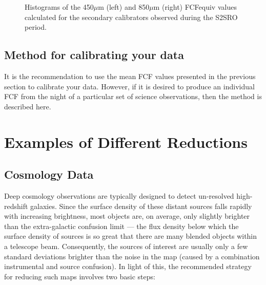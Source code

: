 \documentclass[twoside,11pt]{article}
\newcommand{\xref}[3]{#1}
\newcommand{\xlabel}[1]{}
\renewcommand{\_}{\texttt{\symbol{95}}}
\newcommand{\task}[1]{\textsf{#1}}
\newcommand{\cmult}{\xref{\task{cmult}}{sun95}{CMULT}}
\begin{document}
\begin{figure}
\begin{center}
\caption{Histograms of the 450$\mu$m (left) and 850$\mu$m (right)
  FCF\_equiv values calculated for the secondary calibrators observed
  during the S2SRO period.}
\label{fig:fcfs}
\end{center}
\end{figure}

\subsection{Method for calibrating your data}


It is the recommendation to use the mean FCF values presented in the
previous section to calibrate your data. However, if it is desired to
produce an individual FCF from the night of a particular set of
science observations, then the method is described here.


\section{\xlabel{Examples}Examples of Different Reductions}
\label{sec:eg}

\subsection{\xlabel{Cosmology}Cosmology Data}
\label{sec:cosmology}

Deep cosmology observations are typically designed to detect
un-resolved high-redshift galaxies. Since the surface density of these
distant sources falls rapidly with increasing brightness, most objects
are, on average, only slightly brighter than the extra-galactic
confusion limit --- the flux density below which the surface density
of sources is so great that there are many blended objects within a
telescope beam. Consequently, the sources of interest are usually only
a few standard deviations brighter than the noise in the map (caused
by a combination instrumental and source confusion). In light of this,
the recommended strategy for reducing such maps involves two basic
steps:
\end{document}
